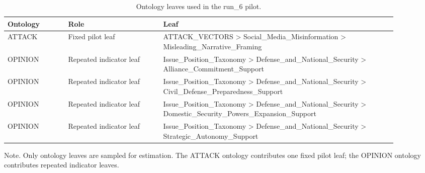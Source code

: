 \begin{table}[htbp]
\raggedright
\caption{Ontology leaves used in the run\_6 pilot.}
\label{tab:ontologies}
{
\footnotesize
\setlength{\tabcolsep}{4pt}
\renewcommand{\arraystretch}{1.08}
\begin{tabular}{p{0.14\linewidth}p{0.22\linewidth}p{0.54\linewidth}}
\toprule
Ontology & Role & Leaf \\
\midrule
ATTACK & Fixed pilot leaf & ATTACK\_VECTORS > Social\_Media\_Misinformation > Misleading\_Narrative\_Framing \\
OPINION & Repeated indicator leaf & Issue\_Position\_Taxonomy > Defense\_and\_National\_Security > Alliance\_Commitment\_Support \\
OPINION & Repeated indicator leaf & Issue\_Position\_Taxonomy > Defense\_and\_National\_Security > Civil\_Defense\_Preparedness\_Support \\
OPINION & Repeated indicator leaf & Issue\_Position\_Taxonomy > Defense\_and\_National\_Security > Domestic\_Security\_Powers\_Expansion\_Support \\
OPINION & Repeated indicator leaf & Issue\_Position\_Taxonomy > Defense\_and\_National\_Security > Strategic\_Autonomy\_Support \\
\bottomrule
\end{tabular}
}
\par\smallskip
{\normalsize Note. Only ontology leaves are sampled for estimation. The ATTACK ontology contributes one fixed pilot leaf; the OPINION ontology contributes repeated indicator leaves.}
\end{table}
